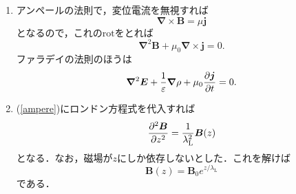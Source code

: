 \documentclass[a4paper,pdflatex,ja=standard]{bxjsarticle}
\begin{document}
\begin{enumerate}
  \item 
  アンペールの法則で，変位電流を無視すれば
  \begin{equation}
    \bm{\nabla}
    \times
    \bm{B}
    =
    \mu\bm{j}
  \end{equation}
  となるので，これの$\text{rot}$をとれば
  \begin{equation}
    \bm{\nabla}^2
    \bm{B}
    +
    \mu_{0}\bm{\nabla}\times\bm{j}
    =
    0
    .
    \label{ampere}
  \end{equation}
  ファラデイの法則のほうは
  \begin{equation}
    \bm{\nabla}^2
    \bm{E}
    +
    \frac{1}{\varepsilon}\bm{\nabla}\rho
    +
    \mu_{0}\pdv{\bm{j}}{t}
    =
    0
    .
  \end{equation}

  \item 
  (\ref{ampere})にロンドン方程式を代入すれば
  \begin{equation}
    \pdv[2]{\bm{B}}{z}
    =
    \frac{1}{\lambda_{\text{L}}^2}
    \bm{B}(z)
  \end{equation}
  となる．なお，磁場が$z$にしか依存しないとした．これを解けば
  \begin{equation}
    \bm{B}(z)
    =
    \bm{B}_{0}e^{z/\lambda_{\text{L}}}
  \end{equation}
  である．

\end{enumerate}
\end{document}
